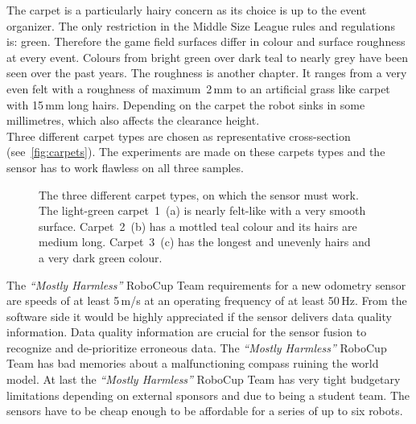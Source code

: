 \documentclass[12pt,a4paper]{article}
\newcommand{\MH}{\emph{``Mostly Harmless''} RoboCup Team\xspace}
\newcommand{\MSL}{Middle Size League\xspace}
\begin{document}
The carpet is a particularly hairy concern as its choice is up to the event organizer.
The only restriction in the \MSL rules and regulations~\cite{msl-rules} is: green.
Therefore the game field surfaces differ in colour and surface roughness at every event.
Colours from bright green over dark teal to nearly grey have been seen over the past years.
The roughness is another chapter.
It ranges from a very even felt with a roughness of maximum~2\,mm to an artificial grass like carpet with 15\,mm long hairs. 
Depending on the carpet the robot sinks in some millimetres, which also affects the clearance height.\\
Three different carpet types are chosen as representative cross-section (see~\autoref{fig:carpets}).
The experiments are made on these carpets types and the sensor has to work flawless on all three samples.

\begin{figure}[htbp]
  \begin{center}
      \hfill
      \hfill
    \caption{
      The three different carpet types, on which the sensor must work.
      The light-green carpet~1~(a) is nearly felt-like with a very smooth surface.
      Carpet~2~(b) has a mottled teal colour and its hairs are medium long.
      Carpet~3~(c) has the longest and unevenly hairs and a very dark green colour.
    }
    \label{fig:carpets}
  \end{center}
\end{figure}



The \MH requirements for a new odometry sensor are speeds of at least 5\,m/s at an operating frequency of at least 50\,Hz.
From the software side it would be highly appreciated if the sensor delivers data quality information.
Data quality information are crucial for the sensor fusion to recognize and de-prioritize erroneous data.
The \MH has bad memories about a malfunctioning compass ruining the world model.
At last the \MH has very tight budgetary limitations depending on external sponsors and due to being a student team.
The sensors have to be cheap enough to be affordable for a series of up to six robots.
\end{document}
